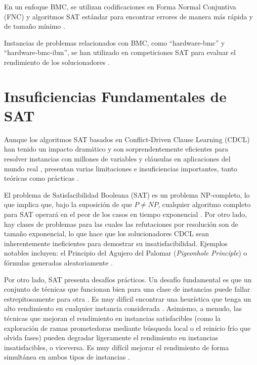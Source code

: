 En un enfoque BMC, se utilizan codificaciones en Forma Normal Conjuntiva (FNC) y algoritmos SAT estándar para encontrar errores de manera más rápida y de tamaño mínimo \cite{hoos1998sat}.  %

Instancias de problemas relacionados con BMC, como ``hardware-bmc'' y ``hardware-bmc-ibm'', se han utilizado en competiciones SAT para evaluar el rendimiento de los solucionadores \cite{biere2019restart_schemes}. %

\section{Insuficiencias Fundamentales de SAT}
\label{sec:ineficiencia-sat}

Aunque los algoritmos SAT basados en Conflict-Driven Clause Learning (CDCL) han tenido un impacto dramático y son sorprendentemente eficientes para resolver instancias con millones de variables y cláusulas en aplicaciones del mundo real \cite{li2024reset_rl},  presentan varias limitaciones e insuficiencias importantes, tanto teóricas como prácticas \cite{marques-silva2024cdcl}.

El problema de Satisfacibilidad Booleana (SAT) es un problema NP-completo, lo que implica que, bajo la suposición de que $P \neq NP$, cualquier algoritmo completo para SAT operará en el peor de los casos en tiempo exponencial \cite{marques-silva2024cdcl}. Por otro lado, hay clases de problemas para las cuales las refutaciones por resolución son de tamaño exponencial, lo que hace que los solucionadores CDCL sean inherentemente ineficientes para demostrar su insatisfacibilidad. Ejemplos notables incluyen: el Principio del Agujero del Palomar (\textit{Pigeonhole Principle}) o f\'ormulas generadas aleatoriamente  \cite{ganesh_unreasonable}.

Por otro lado, SAT presenta desaf\'ios pr\'acticos. Un desafío fundamental es que un conjunto de técnicas que funcionan bien para una clase de instancias puede fallar estrepitosamente para otra \cite{li2024reset_rl}. Es muy difícil encontrar una heurística que tenga un alto rendimiento en cualquier instancia considerada \cite{cherif2021combining}. Asimismo, a menudo, las técnicas que mejoran el rendimiento en instancias satisfacibles (como la exploración de ramas prometedoras mediante búsqueda local o el reinicio frío que olvida fases) pueden degradar ligeramente el rendimiento en instancias insatisfacibles, o viceversa. Es muy difícil mejorar el rendimiento de forma simultánea en ambos tipos de instancias \cite{cherif2024vsidschb}. 

